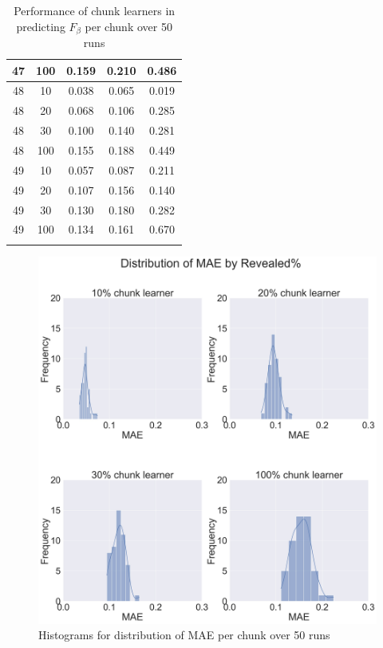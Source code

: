 \begin{longtable}{ |c|c|c|c|c| }
            47 & 100 & 0.159 & 0.210 & 0.486 \\ \hline
            48 & 10 & 0.038 & 0.065 & 0.019 \\ \hline
            48 & 20 & 0.068 & 0.106 & 0.285 \\ \hline
            48 & 30 & 0.100 & 0.140 & 0.281 \\ \hline
            48 & 100 & 0.155 & 0.188 & 0.449 \\ \hline
            49 & 10 & 0.057 & 0.087 & 0.211 \\ \hline
            49 & 20 & 0.107 & 0.156 & 0.140 \\ \hline
            49 & 30 & 0.130 & 0.180 & 0.282 \\ \hline
            49 & 100 & 0.134 & 0.161 & 0.670 \\ \hline
        \caption{Performance of chunk learners in predicting $F_{\beta}$ per chunk over 50 runs}
    \end{longtable}


    \begin{figure}[!htb]
        \captionsetup{justification=raggedright}
        \centering
        \includegraphics[width=\textwidth]{./Chapters/06 Results/hist_mae.jpg}
        \centering
        \caption{Histograms for distribution of MAE per chunk over 50 runs}
    \end{figure}


